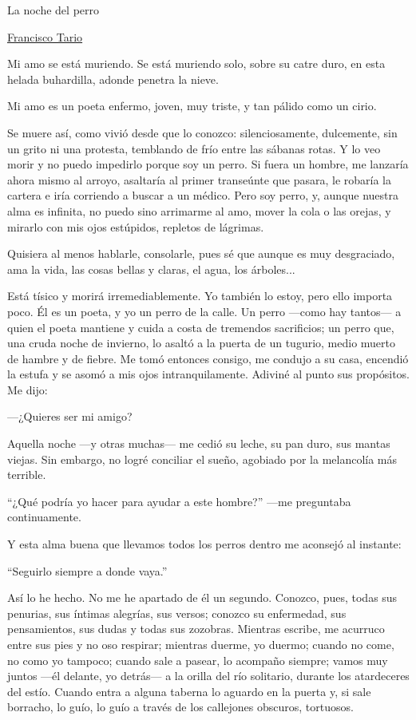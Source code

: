 \documentclass[14pt,a5paper,oneside,final]{extbook}
\begin{document}
\parindent=5mm
\parskip=0mm
\begin{center}
La noche del perro
\end{center}
\begin{center}
\href{https://es.wikipedia.org/wiki/Francisco\_Tario}{Francisco Tario}
\end{center}
\vspace{14pt}
Mi amo se está muriendo. Se está muriendo solo, sobre su catre duro, en esta helada buhardilla, adonde penetra la nieve.

Mi amo es un poeta enfermo, joven, muy triste, y tan pálido como un cirio.

Se muere así, como vivió desde que lo conozco: silenciosamente, dulcemente, sin un grito ni una protesta, temblando de frío entre las sábanas rotas. Y lo veo morir y no puedo impedirlo porque soy un perro. Si fuera un hombre, me lanzaría ahora mismo al arroyo, asaltaría al primer transeúnte que pasara, le robaría la cartera e iría corriendo a buscar a un médico. Pero soy perro, y, aunque nuestra alma es infinita, no puedo sino arrimarme al amo, mover la cola o las orejas, y mirarlo con mis ojos estúpidos, repletos de lágrimas.

Quisiera al menos hablarle, consolarle, pues sé que aunque es muy desgraciado, ama la vida, las cosas bellas y claras, el agua, los árboles...

Está tísico y morirá irremediablemente. Yo también lo estoy, pero ello importa poco. Él es un poeta, y yo un perro de la calle. Un perro ---como hay tantos--- a quien el poeta mantiene y cuida a costa de tremendos sacrificios; un perro que, una cruda noche de invierno, lo asaltó a la puerta de un tugurio, medio muerto de hambre y de fiebre. Me tomó entonces consigo, me condujo a su casa, encendió la estufa y se asomó a mis ojos intranquilamente. Adiviné al punto sus propósitos. Me dijo:

---¿Quieres ser mi amigo?

Aquella noche ---y otras muchas--- me cedió su leche, su pan duro, sus mantas viejas. Sin embargo, no logré conciliar el sueño, agobiado por la melancolía más terrible.

``¿Qué podría yo hacer para ayudar a este hombre?'' ---me preguntaba continuamente.

Y esta alma buena que llevamos todos los perros dentro me aconsejó al instante:

``Seguirlo siempre a donde vaya.''

Así lo he hecho. No me he apartado de él un segundo. Conozco, pues, todas sus penurias, sus íntimas alegrías, sus versos; conozco su enfermedad, sus pensamientos, sus dudas y todas sus zozobras. Mientras escribe, me acurruco entre sus pies y no oso respirar; mientras duerme, yo duermo; cuando no come, no como yo tampoco; cuando sale a pasear, lo acompaño siempre; vamos muy juntos ---él delante, yo detrás--- a la orilla del río solitario, durante los atardeceres del estío. Cuando entra a alguna taberna lo aguardo en la puerta y, si sale borracho, lo guío, lo guío a través de los callejones obscuros, tortuosos.
\end{document}
